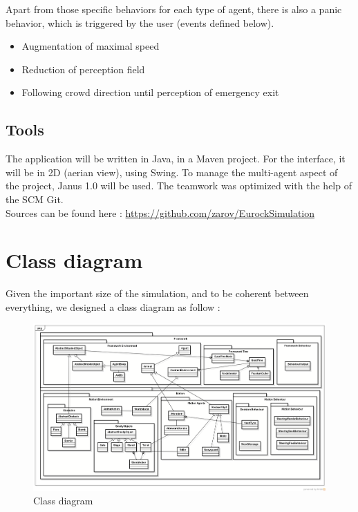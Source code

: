 Apart from those specific behaviors for each type of agent, there is also
a panic behavior, which is triggered by the user (events defined
below).

\begin{itemize}
	\item Augmentation of maximal speed
	\item Reduction of perception field
	\item Following crowd direction until perception of emergency exit
\end{itemize}


\subsection{Tools}

The application will be written in Java, in a Maven project. For the interface,
it will be in 2D (aerian view), using Swing. To manage the multi-agent aspect of
the project, Janus 1.0 will be used. The teamwork was optimized with the help of 
the SCM Git.\\

Sources can be found here :
\href{https://github.com/zarov/EurockSimulation}{https://github.com/zarov/EurockSimulation}

\section{Class diagram}

Given the important size of the simulation, and to be coherent between everything, we designed a class diagram as follow :

\newpage

\begin{figure}[h]
	\begin{center}
		\includegraphics[width=0.72\textheight, angle=90]{img/classdiagram.png}
	\end{center}
	\caption{Class diagram}
\end{figure}


